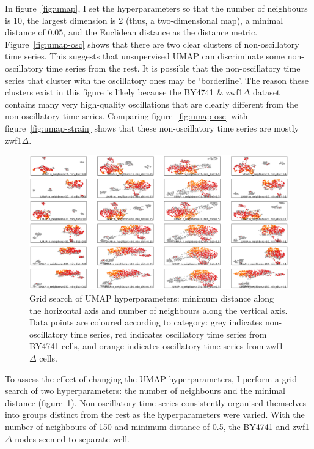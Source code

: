 In figure~\ref{fig:umap}, I set the hyperparameters so that the number of neighbours is 10, the largest dimension is 2 (thus, a two-dimensional map), a minimal distance of 0.05, and the Euclidean distance as the distance metric.
Figure~\ref{fig:umap-osc} shows that there are two clear clusters of non-oscillatory time series.
This suggests that unsupervised UMAP can discriminate some non-oscillatory time series from the rest.
It is possible that the non-oscillatory time series that cluster with the oscillatory ones may be `borderline'.
The reason these clusters exist in this figure is likely because the BY4741 \& zwf1$\Delta$ dataset contains many very high-quality oscillations that are clearly different from the non-oscillatory time series.
Comparing figure~\ref{fig:umap-osc} with figure~\ref{fig:umap-strain} shows that these non-oscillatory time series are mostly zwf1$\Delta$.

\begin{figure}
  \centering
    \includegraphics[width=0.9\linewidth]{IdenFeatures_20016_UMAP_22_cropped}
    \caption{
      Grid search of UMAP hyperparameters: minimum distance along the horizontal axis and number of neighbours along the vertical axis.
      Data points are coloured according to category: grey indicates non-oscillatory time series, red indicates oscillatory time series from BY4741 cells, and orange indicates oscillatory time series from zwf1$\Delta$ cells.
    }
  \label{fig:umap-gridsearch}
\end{figure}

To assess the effect of changing the UMAP hyperparameters, I perform a grid search of two hyperparameters: the number of neighbours and the minimal distance (figure~\ref{fig:umap-gridsearch}).
Non-oscillatory time series consistently organised themselves into groups distinct from the rest as the hyperparameters were varied.
With the number of neighbours of 150 and minimum distance of 0.5, the BY4741 and zwf1$\Delta$ nodes seemed to separate well.

